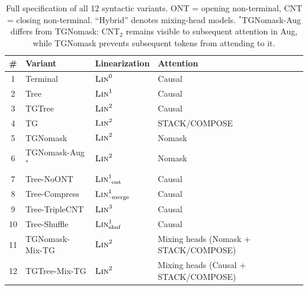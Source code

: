 \documentclass[11pt]{article}
\begin{document}

\begin{table}[t]
  \centering
  \setlength{\tabcolsep}{6pt}
  \begin{tabular}{cllll}
    \toprule
    \# & Variant & Linearization & Attention  \\
    \midrule
    1 & Terminal & $\textsc{Lin}^0$ & Causal  \\
    2 & Tree & $\textsc{Lin}^1$ & Causal \\
    3 & TGTree & $\textsc{Lin}^2$ & Causal  \\
    4 & TG & $\textsc{Lin}^2$ & STACK/COMPOSE  \\
    5 & TGNomask & $\textsc{Lin}^2$ & Nomask  \\
    6 & TGNomask-Aug$^*$ & $\textsc{Lin}^2$ & Nomask  \\
    7 & Tree-NoONT & $\textsc{Lin}^1_{\text{--ont}}$ & Causal \\
    8 & Tree-Compress & $\textsc{Lin}^1_{\text{--merge}}$ & Causal \\
    9 & Tree-TripleCNT & $\textsc{Lin}^3$ & Causal  \\
    10 & Tree-Shuffle & $\textsc{Lin}^1_{\text{shuf}}$ & Causal   \\
    11 & TGNomask-Mix-TG & $\textsc{Lin}^2$ & Mixing heads (Nomask + STACK/COMPOSE)  \\
    12 & TGTree-Mix-TG & $\textsc{Lin}^2$ & Mixing heads (Causal   + STACK/COMPOSE)  \\
    \bottomrule
  \end{tabular}
  \caption{Full specification of all 12 syntactic variants. ONT = opening non-terminal, CNT = closing non-terminal. ``Hybrid'' denotes mixing-head models. $^*$TGNomask-Aug differs from TGNomask: CNT$_2$ remains visible to subsequent attention in Aug, while TGNomask prevents subsequent tokens from attending to it.}
  \label{tab:variants}
\end{table}
\end{document}

